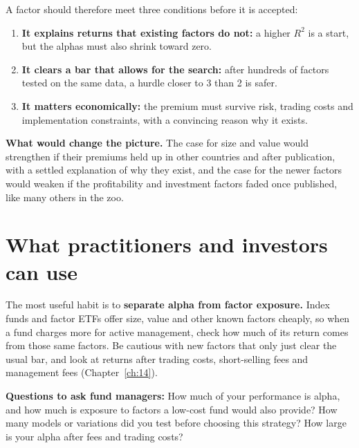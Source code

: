 A factor should therefore meet three conditions before it is accepted:

\begin{enumerate}
  \item \textbf{It explains returns that existing factors do not:} a higher $R^2$ is a start, but the alphas must also shrink toward zero.
  \item \textbf{It clears a bar that allows for the search:} after hundreds of factors tested on the same data, a hurdle closer to 3 than 2 is safer.
  \item \textbf{It matters economically:} the premium must survive risk, trading costs and implementation constraints, with a convincing reason why it exists.
\end{enumerate}

\textbf{What would change the picture.} The case for size and value would strengthen if their premiums held up in other countries and after publication, with a settled explanation of why they exist, and the case for the newer factors would weaken if the profitability and investment factors faded once published, like many others in the zoo.

\section{What practitioners and investors can use}
\label{sec:04-investors}

The most useful habit is to \textbf{separate alpha from factor exposure.} Index funds and factor ETFs offer size, value and other known factors cheaply, so when a fund charges more for active management, check how much of its return comes from those same factors. Be cautious with new factors that only just clear the usual bar, and look at returns after trading costs, short-selling fees and management fees (Chapter~\ref{ch:14}).

\textbf{Questions to ask fund managers:} How much of your performance is alpha, and how much is exposure to factors a low-cost fund would also provide? How many models or variations did you test before choosing this strategy? How large is your alpha after fees and trading costs?

\makeatletter
{}
\makeatother

